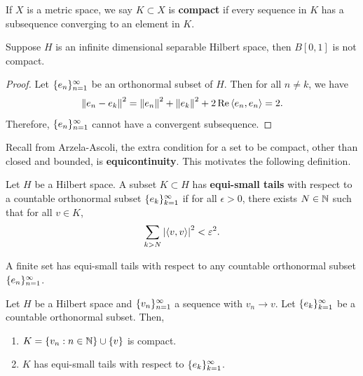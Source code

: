 \documentclass[a4paper]{article}
\renewcommand{\braket}[2]{\left\langle #1, #1 \right\rangle}
\begin{document}
\begin{defi}[Compact]
  If $X$ is a metric space, we say $K \subset X$
  is \textbf{compact} if every sequence in $K$
  has a subsequence converging to an element in $K$.
\end{defi}

\begin{eg}
  Suppose $H$ is an infinite dimensional separable
  Hilbert space, then $B[0, 1]$ is not compact.
\end{eg}

\begin{proof}
  Let $\{ e_n \}_{n=1}^\infty$ be an orthonormal subset of $H$.
  Then for all $n \neq k$, we have
  \[
    \norm{e_n - e_k}^2 = \norm{e_n}^2 + \norm{e_k}^2
    + 2 \Re \braket{e_n}{e_k} = 2.
  \]
  Therefore, $\{ e_n \}_{n=1}^\infty$ cannot have a convergent
  subsequence.
\end{proof}

Recall from Arzela-Ascoli, the extra condition for a
set to be compact, other than closed and bounded,
is \textbf{equicontinuity}.
This motivates the following definition.

\begin{defi}
  Let $H$ be a Hilbert space. A subset $K \subset H$ has
  \textbf{equi-small tails} with respect to a countable
  orthonormal subset $\{ e_k \}_{k=1}^\infty$ if for all
  $\epsilon > 0$, there exists $N \in \mathbb{N}$ such that
  for all $v \in K$,
  \[
    \sum_{k > N} \abs{\braket{v}{e_k}}^2 < \epsilon^2.
  \]
\end{defi}

\begin{eg}
  A finite set has equi-small tails with respect to
  any countable orthonormal subset $\{ e_n \}_{n=1}^\infty$.
\end{eg}

\begin{thm}
  Let $H$ be a Hilbert space and $\{ v_n \}_{n=1}^\infty$
  a sequence with $v_n \to v$. Let $\{ e_k \}_{k=1}^\infty$
  be a countable orthonormal subset. Then,
  \begin{enumerate}
    \item $K = \left\{ v_n : n \in \mathbb{N} \right\}
            \cup \left\{ v \right\}$ is compact.

    \item $K$ has equi-small tails with respect to
          $\{ e_k \}_{k=1}^\infty$.
  \end{enumerate}
\end{thm}
\end{document}
